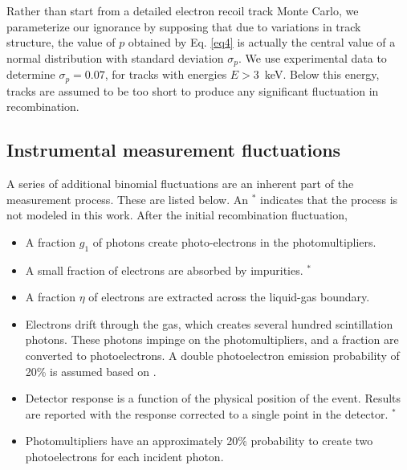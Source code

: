 \documentclass[article]{revtex4-1}[11pt]
\begin{document}
Rather than start from a detailed electron recoil track Monte Carlo, we parameterize our ignorance by supposing that due to variations in track structure, the value of $p$ obtained by Eq. \ref{eq4} is actually the central value of a normal distribution with standard deviation $\sigma_p$. We use experimental data to determine $\sigma_p=0.07$, for tracks with energies $E>3$~keV. Below this energy, tracks are assumed to be too short to produce any significant fluctuation in recombination.





\subsection{Instrumental measurement fluctuations} \label{sec:model:meas}
A series of additional binomial fluctuations are an inherent part of the measurement process. These are listed below. An $^*$ indicates that the process is not modeled in this work. After the initial recombination fluctuation,
\begin{itemize}
\item A fraction $g_1$ of photons create photo-electrons in the photomultipliers.
\item A small fraction of electrons are absorbed by impurities. $^*$
\item A fraction $\eta$ of electrons are extracted across the liquid-gas boundary.
\item Electrons drift through the gas, which creates several hundred scintillation photons. These photons impinge on the photomultipliers, and a fraction are converted to photoelectrons. A double photoelectron emission probability of 20\% is assumed based on \cite{Faham:2015kqa,Akerib:2015rjg}.
\item Detector response is a function of the physical position of the event. Results are reported with the response corrected to a single point in the detector. $^*$
\item Photomultipliers have an approximately 20\% probability to create two photoelectrons for each incident photon.
\end{itemize}
\end{document}
